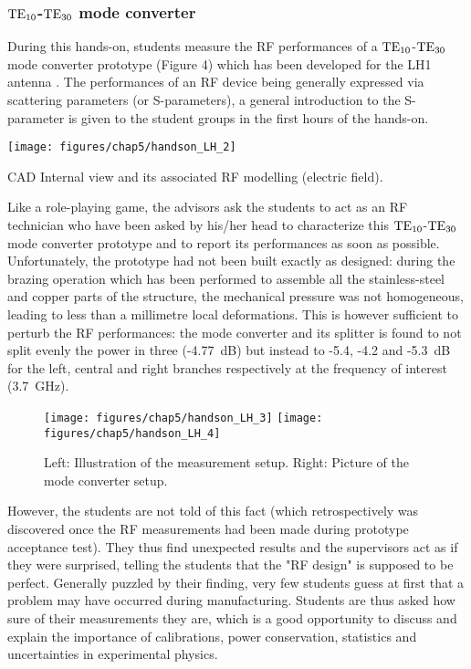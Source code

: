 \subsubsection{${\mathrm{TE}}_{10}$-${\mathrm{TE}}_{30}$ mode converter}

During this hands-on, students measure the RF performances of a ${\mathrm{TE}}_{10}$-${\mathrm{TE}}_{30}$ mode converter prototype (Figure 4) which has been developed for the LH1 antenna . The performances of an RF device being generally expressed via scattering parameters (or S-parameters), a general introduction to the S-parameter is given to the student groups in the first hours of the hands-on. 

\begin{marginfigure}
	\centering
	\texttt{[image: figures/chap5/handson\_LH\_2]}
	\caption{CAD Internal view and its associated RF modelling (electric field).}
	\label{fig:handsonlh2}
\end{marginfigure}

Like a role-playing game, the advisors ask the students to act as an RF technician who have been asked by his/her head to characterize this ${\mathrm{TE}}_{10}$-${\mathrm{TE}}_{30}$ mode converter prototype and to report its performances as soon as possible. Unfortunately, the prototype had not been built exactly as designed: during the brazing operation which has been performed to assemble all the stainless-steel and copper parts of the structure, the mechanical pressure was not homogeneous, leading to less than a millimetre local deformations. This is however sufficient to perturb the RF performances: the mode converter and its splitter is found to not split evenly the power in three (-4.77~dB) but instead to -5.4, -4.2 and -5.3~dB for the left, central and right branches respectively at the frequency of interest (3.7~GHz). 

\begin{figure*}
	\centering
	\texttt{[image: figures/chap5/handson\_LH\_3]}
	\texttt{[image: figures/chap5/handson\_LH\_4]}
	\caption{Left: Illustration of the measurement setup. Right: Picture of the mode converter setup.}
	\label{fig:handsonlh3}
\end{figure*}


However, the students are not told of this fact (which retrospectively was discovered once the RF measurements had been made during prototype acceptance test). They thus find unexpected results and the supervisors act as if they were surprised, telling the students that the "RF design" is supposed to be perfect. Generally puzzled by their finding, very few students guess at first that a problem may have occurred during manufacturing. Students are thus asked how sure of their measurements they are, which is a good opportunity to discuss and explain the importance of calibrations, power conservation, statistics and uncertainties in experimental physics.

